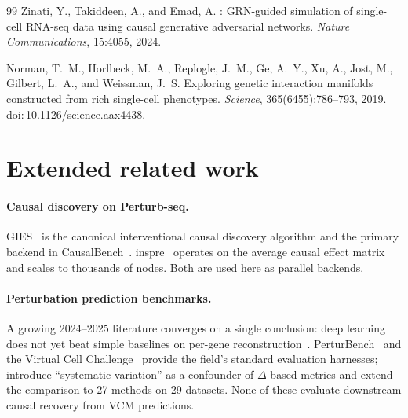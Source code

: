 \documentclass{article}
\theoremstyle{plain}
\theoremstyle{definition}
\theoremstyle{remark}
\begin{document}
\begin{thebibliography}{99}
Zinati, Y., Takiddeen, A., and Emad, A.
: {GRN}-guided simulation of single-cell {RNA}-seq data using causal generative adversarial networks.
\newblock \emph{Nature Communications}, 15:4055, 2024.

Norman, T.~M., Horlbeck, M.~A., Replogle, J.~M., Ge, A.~Y., Xu, A., Jost, M., Gilbert, L.~A., and Weissman, J.~S.
\newblock Exploring genetic interaction manifolds constructed from rich single-cell phenotypes.
\newblock \emph{Science}, 365(6455):786--793, 2019. doi:\,10.1126/science.aax4438.

\end{thebibliography}

\newpage
\appendix
\onecolumn

\section{Extended related work}
\label{app:related-extended}

\paragraph{Causal discovery on Perturb-seq.} GIES~\citep{hauser2012gies} is the canonical interventional causal discovery algorithm and the primary backend in CausalBench~\citep{chevalley2025causalbench}. inspre~\citep{brown2025inspre} operates on the average causal effect matrix and scales to thousands of nodes. Both are used here as parallel backends.

\paragraph{Perturbation prediction benchmarks.} A growing 2024--2025 literature converges on a single conclusion: deep learning does not yet beat simple baselines on per-gene reconstruction~\citep{ahlmanneltze2025,wong2025simple,csendes2025benchmark,wei2025benchmark,vinas2025systema,bendidi2024pca,wenteler2025perteval,zhu2025garm,li2025systematic,mejia2025diversity}. PerturBench~\citep{wu2024perturbench} and the Virtual Cell Challenge~\citep{roohani2025vcc} provide the field's standard evaluation harnesses; \citet{vinas2025systema} introduce ``systematic variation'' as a confounder of $\Delta$-based metrics and \citet{wei2025benchmark} extend the comparison to 27 methods on 29 datasets. None of these evaluate downstream causal recovery from VCM predictions.
\end{document}
